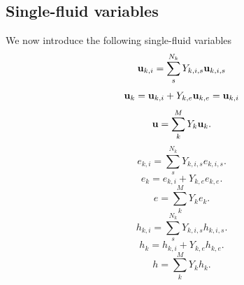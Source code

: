 \documentclass[a4paper,11pt]{report}
\begin{document}
\subsection{Single-fluid variables}
\label{sec:sf_vars}
We now introduce the following single-fluid variables
\begin{equation}
    \label{eq:sf_vars_u_ki}
    \mathbf{u}_{k,i} = \sum_s^{N_k} Y_{k,i,s} \mathbf{u}_{k,i,s} 
\end{equation}
\begin{equation}
    \label{eq:sf_vars_u_k}
    \mathbf{u}_k = \mathbf{u}_{k,i} + Y_{k,e} \mathbf{u}_{k,e} = \mathbf{u}_{k,i}
\end{equation}
\begin{equation}
    \label{eq:sf_vars_u}
    \mathbf{u} = \sum_k^M Y_k \mathbf{u}_k.
\end{equation}
\begin{equation}
    \label{eq:sf_vars_e_ki}
    e_{k,i} = \sum_s^{N_k} Y_{k,i,s} e_{k,i,s}.
\end{equation}
\begin{equation}
    \label{eq:sf_vars_e_k}
    e_k = e_{k,i} + Y_{k,e} e_{k,e}.
\end{equation}
\begin{equation}
    \label{eq:sf_vars_e}
    e = \sum_k^M Y_k e_k.
\end{equation}
\begin{equation}
    h_{k,i} = \sum_s^{N_k} Y_{k,i,s} h_{k,i,s}.
\end{equation}
\begin{equation}
    h_k = h_{k,i} + Y_{k,e} h_{k,e}.
\end{equation}
\begin{equation}
    h = \sum_k^M Y_k h_k.
\end{equation}

\end{document}

